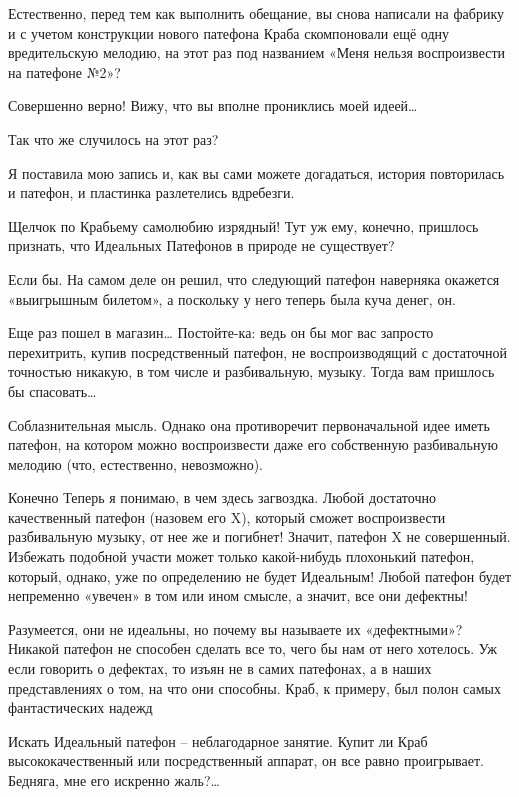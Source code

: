 \documentclass[../main.tex]{subfiles}
\begin{document}
\begin{Dialogue}
 Естественно, перед тем как выполнить обещание, вы снова написали на фабрику и с учетом конструкции нового патефона Краба скомпоновали ещё одну вредительскую мелодию, на этот раз под названием «Меня нельзя воспроизвести на патефоне №2»?

 Совершенно верно! Вижу, что вы вполне прониклись моей идеей\ldots{}

 Так что же случилось на этот раз?

 Я поставила мою запись и, как вы сами можете догадаться, история повторилась и патефон, и пластинка разлетелись вдребезги.

 Щелчок по Крабьему самолюбию изрядный! Тут уж ему, конечно, пришлось признать, что Идеальных Патефонов в природе не существует?

 Если бы. На самом деле он решил, что следующий патефон наверняка окажется «выигрышным билетом», а поскольку у него теперь была куча денег, он.

 Еще раз пошел в магазин\ldots{} Постойте-ка: ведь он бы мог вас запросто перехитрить, купив посредственный патефон, не воспроизводящий с достаточной точностью никакую, в том числе и разбивальную, музыку. Тогда вам пришлось бы спасовать\ldots{}

 Соблазнительная мысль. Однако она противоречит первоначальной идее иметь патефон, на котором можно воспроизвести даже его собственную разбивальную мелодию (что, естественно, невозможно).

 Конечно Теперь я понимаю, в чем здесь загвоздка. Любой достаточно качественный патефон (назовем его X), который сможет воспроизвести разбивальную музыку, от нее же и погибнет! Значит, патефон X не совершенный. Избежать подобной участи может только какой-нибудь плохонький патефон, который, однако, уже по определению не будет Идеальным! Любой патефон будет непременно «увечен» в том или ином смысле, а значит, все они дефектны!

 Разумеется, они не идеальны, но почему вы называете их «дефектными»? Никакой патефон не способен сделать все то, чего бы нам от него хотелось. Уж если говорить о дефектах, то изъян не в самих патефонах, а в наших представлениях о том, на что они способны. Краб, к примеру, был полон самых фантастических надежд

 Искать Идеальный патефон \--- неблагодарное занятие. Купит ли Краб высококачественный или посредственный аппарат, он все равно проигрывает. Бедняга, мне его искренно жаль?\ldots{}


\end{Dialogue}
\end{document}
